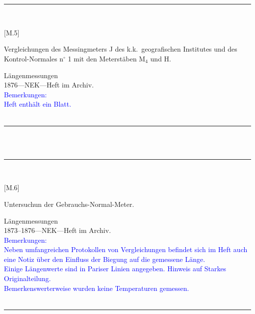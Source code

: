 \\
\vspace*{-2.5pt}\\
\parbox{\textwidth}{%
\rule{\textwidth}{1pt}\vspace*{-3mm}\\
\begin{minipage}[t]{0.2\textwidth}\vspace{0pt}
\Huge\rule[-4mm]{0cm}{1cm}[M.5]
\end{minipage}
\hfill
\begin{minipage}[t]{0.8\textwidth}\vspace{0pt}
\large Vergleichungen des Messingmeters {\glqq}J{\grqq} des k.k.\ geografischen Institutes und des Kontrol-Normales n{$^\circ$} 1 mit den Meterstäben M$_\mathrm{4}$ und H.\rule[-2mm]{0mm}{2mm}
\end{minipage}
{\footnotesize\flushright
Längenmessungen\\
}
1876\quad---\quad NEK\quad---\quad Heft im Archiv.\\
\textcolor{blue}{Bemerkungen:\\{}
Heft enthält ein Blatt.\\{}
}
\\[-15pt]
\rule{\textwidth}{1pt}
}
\\
\vspace*{-2.5pt}\\
\parbox{\textwidth}{%
\rule{\textwidth}{1pt}\vspace*{-3mm}\\
\begin{minipage}[t]{0.2\textwidth}\vspace{0pt}
\Huge\rule[-4mm]{0cm}{1cm}[M.6]
\end{minipage}
\hfill
\begin{minipage}[t]{0.8\textwidth}\vspace{0pt}
\large Untersuchun der Gebrauchs-Normal-Meter.\rule[-2mm]{0mm}{2mm}
\end{minipage}
{\footnotesize\flushright
Längenmessungen\\
}
1873--1876\quad---\quad NEK\quad---\quad Heft im Archiv.\\
\textcolor{blue}{Bemerkungen:\\{}
Neben umfangreichen Protokollen von Vergleichungen befindet sich im Heft auch eine Notiz über den Einfluss der Biegung auf die gemessene Länge.\\{}
Einige Längenwerte sind in Pariser Linien angegeben. Hinweis auf {\glqq}Starkes Originalteilung{\grqq}.\\{}
Bemerkenswerterweise wurden keine Temperaturen gemessen.\\{}
}
\\[-15pt]
\rule{\textwidth}{1pt}
}
